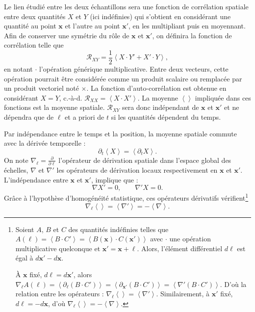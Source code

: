 Le lien étudié entre les deux échantillons sera une fonction de corrélation spatiale entre deux quantités $X$ et $Y$ (ici indéfinies) qui s'obtient en considérant une quantité au point $\mathbf{x}$ et l'autre au point $\mathbf{x'}$, en les multipliant puis en moyennant. Afin de conserver une symétrie du rôle de $\mathbf{x}$ et $\mathbf{x'}$, on définira la fonction de corrélation telle que 
\begin{equation}
    \label{eq:def_correlation} \mathcal{R}_{XY} = \frac{1}{2} \left<X \cdot Y' + X' \cdot Y\right>,
\end{equation}
en notant $\cdot$ l'opération générique multiplicative. Entre deux vecteurs, cette opération pourrait être considérée comme un produit scalaire ou remplacée par un produit vectoriel noté $\times$. La fonction d'auto-corrélation est obtenue en considérant $X=Y$, c.-à-d. $\mathcal{R}_{XX} = \left<X \cdot X'\right>$. 
La moyenne $\left<\right>$ impliquée dans ces fonctions est la moyenne spatiale. $\mathcal{R}_{XY}$ sera donc indépendant de $\mathbf{x}$ et $\mathbf{x'}$ et ne dépendra que de $\boldsymbol{\ell}$ et a priori de $t$ si les quantités dépendent du temps. 

Par indépendance entre le temps et la position, la moyenne spatiale commute avec la dérivée temporelle : 
\begin{equation}
  \label{eq:prop_t}  \partial_t \left<X\right> = \left<\partial_t X\right> .
\end{equation}
On note  $\nabla_{\boldsymbol{\ell}} = \frac{\partial}{\partial \boldsymbol{\ell}}$ l'opérateur de dérivation spatiale dans l'espace global des échelles, $\nabla$ et $\nabla'$ les opérateurs de dérivation locaux respectivement en $\mathbf{x}$ et $\mathbf{x'}$. L'indépendance entre $\mathbf{x}$ et $\mathbf{x'}$, implique que :
\begin{equation}
  \label{eq:prop_x}    \nabla X' = 0,  \qquad \nabla' X = 0.
\end{equation}
Grâce à l'hypothèse d'homogénéité statistique, ces opérateurs dérivatifs vérifient\footnote{
Soient $A$, $B$ et $C$ des quantités indéfinies telles que $A(\boldsymbol{\ell}) = \left<B \cdot C'\right> = \left<B(\mathbf{x}) \cdot C(\mathbf{x'})\right>$  avec $\cdot$ une opération multiplicative quelconque et $\mathbf{x'} = \mathbf{x} + \boldsymbol{\ell}$. Alors, l'élément différentiel $d \boldsymbol{\ell} $ est égal à $d \mathbf{x'} - d \mathbf{x}$. 

À $\mathbf{x}$ fixé, $ d \boldsymbol{\ell} = d \mathbf{x'}$, alors
$\nabla_{\boldsymbol{\ell}} A(\boldsymbol{\ell}) = \left<\partial_{\boldsymbol{\ell}} (B \cdot  C')\right> = \left<\partial_{\mathbf{x'}} (B \cdot  C') \right> = \left<\nabla' (B \cdot  C')\right> $. D'où la relation entre les opérateurs :  $\nabla_{\boldsymbol{\ell}} \left<\right> = \left<\nabla'\right>$. Similairement, à $\mathbf{x'}$ fixé, $ d \boldsymbol{\ell} = - d \mathbf{x}$, d'où $\nabla_{\boldsymbol{\ell}} \left<\right> = - \left<\nabla\right>$.
}
\begin{equation}
   \label{eq:prop_l}   \nabla_{\boldsymbol{\ell}}\left<\right> = \left<\nabla' \right> = - \left<\nabla \right> .
\end{equation}

